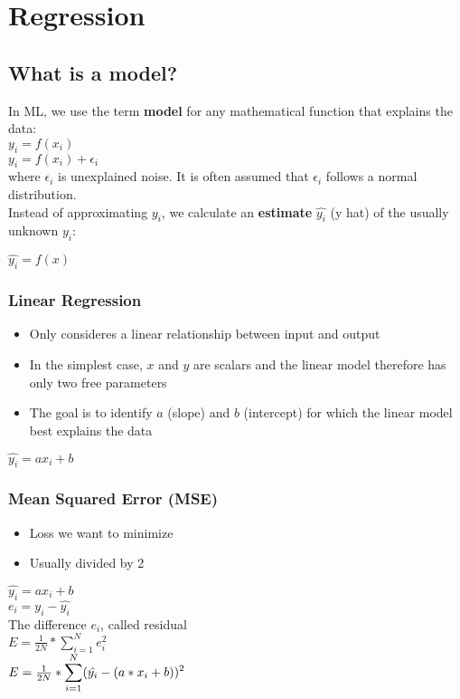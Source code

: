 \section{Regression}
\subsection{What is a model?}
In ML, we use the term \textbf{model} for any mathematical function that explains the data:\\ 
$y_i = f(x_i)$\\ 
$y_i = f(x_i) + \epsilon_i$\\ 
where $\epsilon_i$ is unexplained noise. It is often assumed that $\epsilon_i$ follows a normal distribution.\\ 
Instead of approximating $y_i$, we calculate an \textbf{estimate} $\hat{y_i}$ (y hat) of the usually unknown $y_i$: \\
\begin{center}
    $\hat{y_i} = f(x)$
\end{center}

\subsubsection{Linear Regression}
\begin{itemize}
    \item Only consideres a linear relationship between input and output
    \item In the simplest case, $x$ and $y$ are scalars and the linear model therefore has only two free parameters
    \item The goal is to identify $a$ (slope) and $b$ (intercept) for which the linear model best explains the data
\end{itemize}
\begin{center}
    $\hat{y_i} = ax_i + b$
\end{center}

\subsubsection{Mean Squared Error (MSE)}
\begin{itemize}
    \item Loss we want to minimize
    \item Usually divided by 2
\end{itemize}
\begin{center}
    $\hat{y_i} = ax_i + b$\\ 
    $e_i = y_i - \hat{y_i}$ \\ 
    The difference $e_i$, called residual\\ 
    $E = \frac{1}{2N} * \displaystyle\sum_{i = 1}^{N} e_i^2$\\
    $E = \frac{1}{2N} * \large\displaystyle\sum_{i = 1}^{N}(\hat{y_i} - (a*x_i + b))^2$
\end{center}

